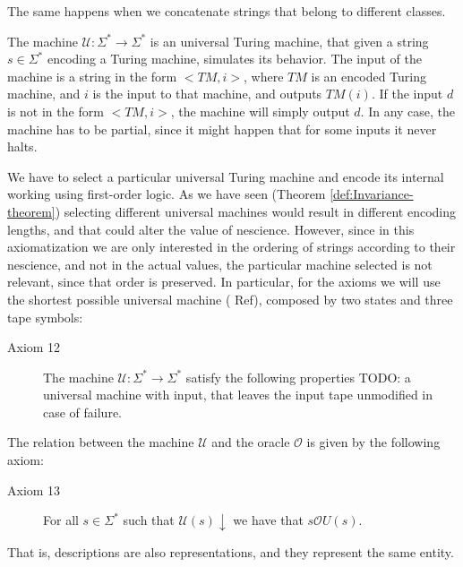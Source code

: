 The same happens when we concatenate strings that belong to different classes. 

The machine $\mathcal{U} : \Sigma^\ast \rightarrow \Sigma^\ast$ is an universal Turing machine, that given a string $s \in \Sigma^\ast$ encoding a Turing machine, simulates its behavior. The input of the machine is a string in the form $<TM, i>$, where $TM$ is an encoded Turing machine, and $i$ is the input to that machine, and outputs $TM(i)$. If the input $d$ is not in the form $<TM, i>$, the machine will simply output $d$. In any case, the machine has to be partial, since it might happen that for some inputs it never halts.

We have to select a particular universal Turing machine and encode its internal working using first-order logic. As we have seen (Theorem \ref{def:Invariance-theorem}) selecting different universal machines would result in different encoding lengths, and that could alter the value of nescience. However, since in this axiomatization we are only interested in the ordering of strings according to their nescience, and not in the actual values, the particular machine selected is not relevant, since that order is preserved. In particular, for the axioms we will use the shortest possible universal machine ({\color{red} Ref}), composed by two states and three tape symbols:

\vskip 0.25cm

\begin{description}
\item[Axiom 12] The machine $\mathcal{U} : \Sigma^\ast \rightarrow \Sigma^\ast$ satisfy the following properties {\color{red} TODO: a universal machine with input, that leaves the input tape unmodified in case of failure.}
\end{description}

\vskip 0.25cm

The relation between the machine $\mathcal{U}$ and the oracle $\mathcal{O}$ is given by the following axiom:

\vskip 0.25cm

\begin{description}
\item[Axiom 13] For all $s \in \Sigma^\ast$ such that $\mathcal{U}(s) \downarrow$ we have that $s \mathcal{O} U(s)$.
\end{description}

\vskip 0.25cm

That is, descriptions are also representations, and they represent the same entity.

